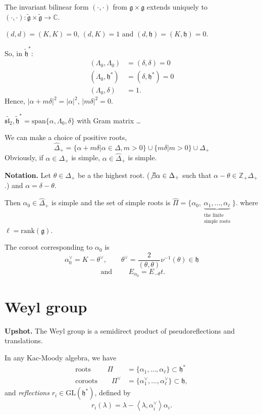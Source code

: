\medskip\noindent
The invariant bilinear form $(\cdot,\cdot)$ from $\mathfrak{g} \times
\mathfrak{g}$ extends uniquely to
$(\cdot,\cdot):\tilde{\mathfrak{g}}\times\tilde{\mathfrak{g}}\to \mathbb{C}$.

$(d,d)=(K,K)=0$, $(d,K)=1$ and $(d,\mathfrak{h})=(K,\mathfrak{h})=0$.

\medskip\noindent
So, in $\tilde{\mathfrak{h}}^*$:
\begin{align*}
(\Lambda_0,\Lambda_0)&=(\delta,\delta)=0\\
(\Lambda_0,\mathfrak{h}^*)&=(\delta,\mathfrak{h}^*)=0\\
(\Lambda_0,\delta)&=1.
\end{align*}
Hence, $|\alpha+m \delta|^2=|\alpha|^2$, $|m \delta|^2=0$.

\begin{example}
\label{example-sl2hat}
$\widetilde{\mathfrak{sl}_2}, \tilde{\mathfrak{h}}^*
=\text{span}\{\alpha,\Lambda_0,\delta\}$ with Gram matrix …
\end{example}

We can make a choice of positive roots,
$$
\hat{\Delta}_+=\{\alpha+m \delta |\alpha \in \Delta, m>0\}
\cup \{m \delta|m>0\} \cup \Delta_+
$$
Obviously, if $\alpha \in \Delta_+$ is simple, 
$\alpha \in \hat{\Delta}_+$ is simple.

\medskip\noindent
{\bf Notation.} Let $\theta \in \Delta_+$ be a the highest root. ($\not \exists
\alpha \in \Delta_+$ such that $\alpha-\theta \in \mathbb{Z}_+ \Delta_+$.) and
 $\alpha=\delta-\theta$.

Then $\alpha_0 \in \hat{\Delta}_+$ is simple and the set of simple roots is
$\hat{\Pi}=\{\alpha_0,\underbrace{\alpha_1,\ldots,\alpha_\ell}
_{\substack{\text{the finite} \\ \text{simple roots}}} \}.$
where $\ell=\text{rank}(\mathfrak{g})$.

The coroot corresponding to $\alpha_0$ is 
$$
\alpha^\vee_0=K-\theta^\vee, \qquad
\theta^\vee=\frac{2}{(\theta,\theta)}\nu^{-1}(\theta) \in \mathfrak{h} 
$$
$$
\text{ and }\qquad E_{\alpha_0}=E_{-\theta}t.
$$

\section{Weyl group}
\label{section-Weyl-group}

\medskip\noindent
{\bf Upshot.} The Weyl group is a semidirect product of 
pseudoreflections and translations.

\medskip\noindent
In any Kac-Moody algebra, we have
\begin{align*}
\text{roots }\qquad \Pi&=\{\alpha_1,\ldots,\alpha_\ell\}\subset\mathfrak{h}^* \\
\text{coroots}\qquad  \Pi^\vee&=\{\alpha_1^\vee,\ldots,\alpha_\ell^\vee\}\subset
\mathfrak{h},
\end{align*}
and {\it reflections} $r_i \in \text{GL}(\mathfrak{h}^*)$,
defined by 
$$
r_i(\lambda)=\lambda-\left<\lambda,\alpha_i^\vee\right>\alpha_i.
$$

